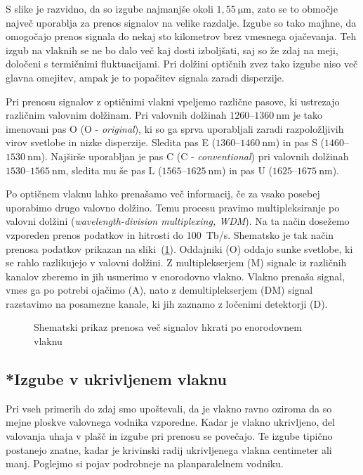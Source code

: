 S slike je razvidno, da so izgube najmanjše
okoli $1,55~\si{\micro\meter}$, zato se to območje največ uporablja za prenos signalov
na velike razdalje. Izgube so tako majhne, da omogočajo prenos signala 
do nekaj sto kilometrov brez vmesnega ojačevanja. Teh izgub na vlaknih se  
ne bo dalo več kaj dosti izboljšati, saj so že zdaj na meji,
določeni s termičnimi fluktuacijami. Pri dolžini optičnih zvez tako izgube niso več glavna
omejitev, ampak je to popačitev signala zaradi disperzije.

\begin{remark}
Pri prenosu signalov z optičnimi vlakni vpeljemo različne pasove, ki ustrezajo 
različnim valovnim dolžinam. Pri valovnih dolžinah $1260$--$1360~\si{\nano\meter}$ je tako imenovani
pas O (O - {\it original}), ki so ga sprva uporabljali zaradi razpoložljivih virov svetlobe
in nizke disperzije. Sledita pas E ($1360$--$1460~\si{\nano\meter}$) in pas S ($1460$--$1530~\si{\nano\meter}$). 
Najširše uporabljan je pas C (C - {\it conventional}) pri valovnih dolžinah $1530$--$1565~\si{\nano\meter}$,
sledita mu še pas L ($1565$--$1625~\si{\nano\meter}$) in pas U ($1625$--$1675~\si{\nano\meter}$).

Po optičnem vlaknu lahko prenašamo več informacij, če za vsako posebej uporabimo
drugo valovno dolžino. Temu procesu pravimo multipleksiranje po valovni dolžini
({\it wavelength-division multiplexing, WDM}).
Na ta način dosežemo vzporeden prenos podatkov in hitrosti do 100~Tb/s.
Shematsko je tak način prenosa podatkov prikazan na sliki~(\ref{WDM}).
Oddajniki (O) oddajo sunke svetlobe, ki se rahlo razlikujejo v valovni dolžini. 
Z multiplekserjem (M) signale iz različnih kanalov zberemo in jih usmerimo v 
enorodovno vlakno. Vlakno prenaša signal, vmes ga po potrebi ojačimo (A), 
nato z demultiplekserjem (DM) signal razstavimo na posamezne kanale, ki jih 
zaznamo z ločenimi detektorji (D).
\begin{figure}[h]
\centering
\def\svgwidth{120truemm} 
 
\caption{Shematski prikaz prenosa več signalov hkrati po enorodovnem vlaknu}
\label{WDM}
\end{figure}
\end{remark}

\subsection*{*Izgube v ukrivljenem vlaknu}
Pri vseh primerih do zdaj smo upoštevali, da je vlakno ravno 
oziroma da so mejne ploskve valovnega vodnika vzporedne. 
Kadar je vlakno ukrivljeno, del valovanja uhaja v plašč in 
izgube pri prenosu se povečajo. Te izgube tipično postanejo znatne, 
kadar je krivinski radij ukrivljenega vlakna centimeter ali manj. 
Poglejmo si pojav podrobneje na planparalelnem vodniku.

